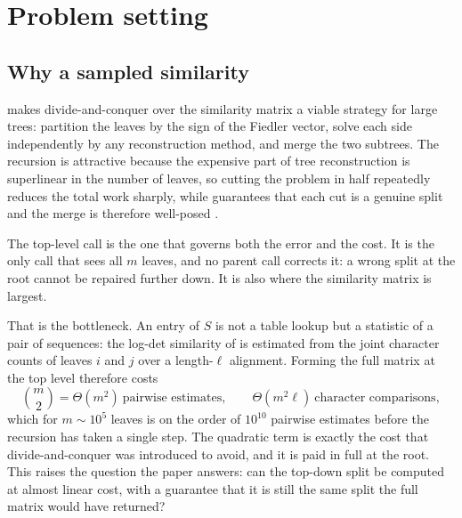 \section{Problem setting}\label{sec:problem}

\subsection{Why a sampled similarity}\label{sec:problem-cost}

 makes divide-and-conquer over the similarity matrix a viable
strategy for large trees: partition the leaves by the sign of the Fiedler vector,
solve each side independently by any reconstruction method, and merge the two
subtrees. The recursion is attractive because the expensive part of tree
reconstruction is superlinear in the number of leaves, so cutting the problem in
half repeatedly reduces the total work sharply, while 
guarantees that each cut is a genuine split and the merge is therefore well-posed
\cite{aizenbud2023spectral}.

The top-level call is the one that governs both the error and the cost. It is the
only call that sees all $m$ leaves, and no parent call corrects it: a wrong split at
the root cannot be repaired further down. It is also where the similarity matrix is
largest.

That is the bottleneck. An entry of $S$ is not a table lookup but a statistic of a
pair of sequences: the log-det similarity of  is estimated
from the joint character counts of leaves $i$ and $j$ over a length-$\ell$
alignment. Forming the full matrix at the top level therefore costs
\begin{equation}\label{eq:cost}
   \binom{m}{2} = \Theta(m^2) \ \text{pairwise estimates},
   \qquad \Theta(m^2\ell) \ \text{character comparisons},
\end{equation}
which for $m \sim 10^5$ leaves is on the order of $10^{10}$ pairwise estimates
before the recursion has taken a single step. The quadratic term is exactly the cost
that divide-and-conquer was introduced to avoid, and it is paid in full at the root.
This raises the question the paper answers: can the top-down split be computed at
almost linear cost, with a guarantee that it is still the same split the full matrix
would have returned?

